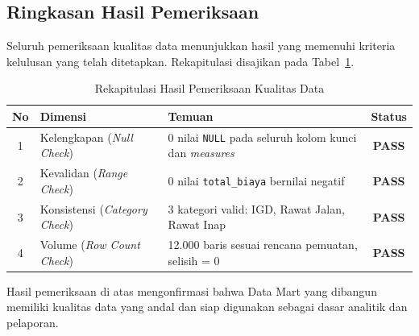 \subsection{Ringkasan Hasil Pemeriksaan}

Seluruh pemeriksaan kualitas data menunjukkan hasil yang memenuhi kriteria
kelulusan yang telah ditetapkan. Rekapitulasi disajikan pada
Tabel~\ref{tab:dq_summary}.

\begin{table}[H]
  \centering
  \caption{Rekapitulasi Hasil Pemeriksaan Kualitas Data}
  \label{tab:dq_summary}
  \small
  \begin{tabularx}{\linewidth}{cp{3cm}Xc}
    \toprule
    \textbf{No} & \textbf{Dimensi} & \textbf{Temuan} & \textbf{Status} \\
    \midrule
    1 & Kelengkapan \newline (\textit{Null Check})
      & 0 nilai \texttt{NULL} pada seluruh kolom kunci dan \textit{measures}
      & \textcolor{green!60!black}{\textbf{PASS}} \\
    \midrule
    2 & Kevalidan \newline (\textit{Range Check})
      & 0 nilai \texttt{total\_biaya} bernilai negatif
      & \textcolor{green!60!black}{\textbf{PASS}} \\
    \midrule
    3 & Konsistensi \newline (\textit{Category Check})
      & 3 kategori valid: IGD, Rawat Jalan, Rawat Inap
      & \textcolor{green!60!black}{\textbf{PASS}} \\
    \midrule
    4 & Volume \newline (\textit{Row Count Check})
      & 12.000 baris sesuai rencana pemuatan, selisih = 0
      & \textcolor{green!60!black}{\textbf{PASS}} \\
    \bottomrule
  \end{tabularx}
\end{table}

Hasil pemeriksaan di atas mengonfirmasi bahwa Data Mart yang dibangun memiliki
kualitas data yang andal dan siap digunakan sebagai dasar analitik dan pelaporan.